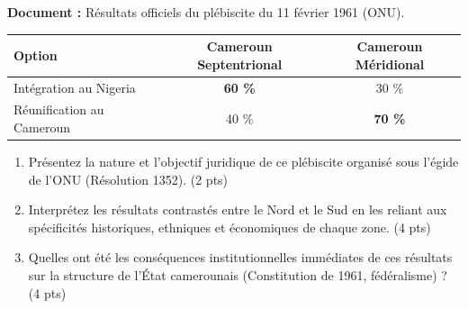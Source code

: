 \documentclass[11pt]{article}
\begin{document}
\begin{exercice}
\textbf{Document :} Résultats officiels du plébiscite du 11 février 1961 (ONU).
\begin{center}
\begin{tabular}{lcc}
\hline
\textbf{Option} & \textbf{Cameroun Septentrional} & \textbf{Cameroun Méridional} \\
\hline
Intégration au Nigeria & \textbf{60 \%} & 30 \% \\
Réunification au Cameroun & 40 \% & \textbf{70 \%} \\
\hline
\end{tabular}
\end{center}

\begin{enumerate}
    \item Présentez la nature et l'objectif juridique de ce plébiscite organisé sous l'égide de l'ONU (Résolution 1352). (2 pts)
    \item Interprétez les résultats contrastés entre le Nord et le Sud en les reliant aux spécificités historiques, ethniques et économiques de chaque zone. (4 pts)
    \item Quelles ont été les conséquences institutionnelles immédiates de ces résultats sur la structure de l'État camerounais (Constitution de 1961, fédéralisme) ? (4 pts)
\end{enumerate}
\end{exercice}
\end{document}
